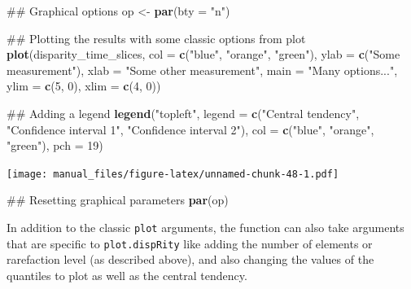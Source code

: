 \documentclass[]{book}
\newenvironment{Shaded}{\begin{snugshade}}{\end{snugshade}}
\newcommand{\KeywordTok}[1]{\textcolor[rgb]{0.13,0.29,0.53}{\textbf{#1}}}
\newcommand{\DataTypeTok}[1]{\textcolor[rgb]{0.13,0.29,0.53}{#1}}
\newcommand{\DecValTok}[1]{\textcolor[rgb]{0.00,0.00,0.81}{#1}}
\newcommand{\StringTok}[1]{\textcolor[rgb]{0.31,0.60,0.02}{#1}}
\newcommand{\NormalTok}[1]{#1}
\theoremstyle{definition}
\theoremstyle{definition}
\theoremstyle{remark}
\begin{document}
\begin{Shaded}
\begin{Highlighting}[]
\NormalTok{## Graphical options}
\NormalTok{op <-}\StringTok{ }\KeywordTok{par}\NormalTok{(}\DataTypeTok{bty =} \StringTok{"n"}\NormalTok{)}

\NormalTok{## Plotting the results with some classic options from plot}
\KeywordTok{plot}\NormalTok{(disparity_time_slices, }\DataTypeTok{col =} \KeywordTok{c}\NormalTok{(}\StringTok{"blue"}\NormalTok{, }\StringTok{"orange"}\NormalTok{, }\StringTok{"green"}\NormalTok{),}
    \DataTypeTok{ylab =} \KeywordTok{c}\NormalTok{(}\StringTok{"Some measurement"}\NormalTok{), }\DataTypeTok{xlab =} \StringTok{"Some other measurement"}\NormalTok{,}
    \DataTypeTok{main =} \StringTok{"Many options..."}\NormalTok{, }\DataTypeTok{ylim =} \KeywordTok{c}\NormalTok{(}\DecValTok{5}\NormalTok{, }\DecValTok{0}\NormalTok{), }\DataTypeTok{xlim =} \KeywordTok{c}\NormalTok{(}\DecValTok{4}\NormalTok{, }\DecValTok{0}\NormalTok{))}

\NormalTok{## Adding a legend}
\KeywordTok{legend}\NormalTok{(}\StringTok{"topleft"}\NormalTok{, }\DataTypeTok{legend =} \KeywordTok{c}\NormalTok{(}\StringTok{"Central tendency"}\NormalTok{,}
                             \StringTok{"Confidence interval 1"}\NormalTok{,}
                            \StringTok{"Confidence interval 2"}\NormalTok{),}
      \DataTypeTok{col =} \KeywordTok{c}\NormalTok{(}\StringTok{"blue"}\NormalTok{, }\StringTok{"orange"}\NormalTok{, }\StringTok{"green"}\NormalTok{), }\DataTypeTok{pch =} \DecValTok{19}\NormalTok{)}
\end{Highlighting}
\end{Shaded}

\texttt{[image: manual\_files/figure-latex/unnamed-chunk-48-1.pdf]}

\begin{Shaded}
\begin{Highlighting}[]
\NormalTok{## Resetting graphical parameters}
\KeywordTok{par}\NormalTok{(op)}
\end{Highlighting}
\end{Shaded}

In addition to the classic \texttt{plot} arguments, the function can
also take arguments that are specific to \texttt{plot.dispRity} like
adding the number of elements or rarefaction level (as described above),
and also changing the values of the quantiles to plot as well as the
central tendency.
\end{document}
